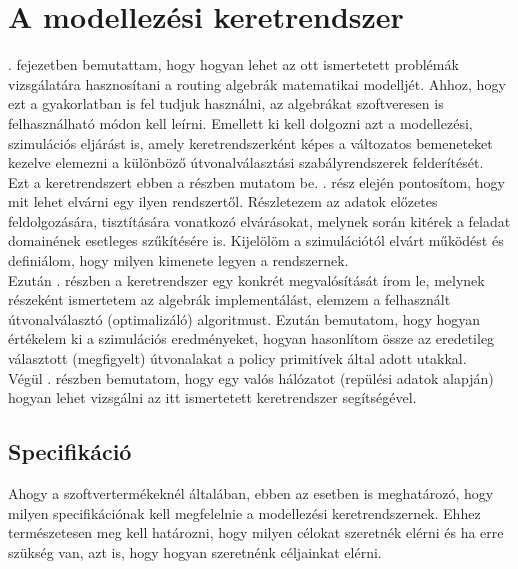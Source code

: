 \chapter{A modellezési keretrendszer}\label{framework}
. fejezetben bemutattam, hogy hogyan lehet az ott ismertetett problémák vizsgálatára hasznosítani a routing algebrák matematikai modelljét. Ahhoz, hogy ezt a gyakorlatban is fel tudjuk használni, az algebrákat szoftveresen is felhasználható módon kell leírni. Emellett ki kell dolgozni azt a modellezési, szimulációs eljárást is, amely keretrendszerként képes a változatos bemeneteket kezelve elemezni a különböző útvonalválasztási szabályrendszerek felderítését.\\

Ezt a keretrendszert ebben a részben mutatom be. . rész elején pontosítom, hogy mit lehet elvárni egy ilyen rendszertől. Részletezem az adatok előzetes feldolgozására, tisztítására vonatkozó elvárásokat, melynek során kitérek a feladat domainének esetleges szűkítésére is. Kijelölöm a szimulációtól elvárt működést és definiálom, hogy milyen kimenete legyen a rendszernek.\\
Ezután . részben a keretrendszer egy konkrét megvalósítását írom le, melynek részeként ismertetem az algebrák implementálást, elemzem a felhasznált útvonalválasztó (optimalizáló) algoritmust. Ezután bemutatom, hogy hogyan értékelem ki a szimulációs eredményeket, hogyan hasonlítom össze az eredetileg választott (megfigyelt) útvonalakat a policy primitívek által adott utakkal.\\
Végül . részben bemutatom, hogy egy valós hálózatot (repülési adatok alapján) hogyan lehet vizsgálni az itt ismertetett keretrendszer segítségével.

  \section{Specifikáció}\label{section_specification}
  Ahogy a szoftvertermékeknél általában, ebben az esetben is meghatározó, hogy milyen specifikációnak kell megfelelnie a modellezési keretrendszernek. Ehhez természetesen meg kell határozni, hogy milyen célokat szeretnék elérni és ha erre szükség van, azt is, hogy hogyan szeretnénk céljainkat elérni.\\

